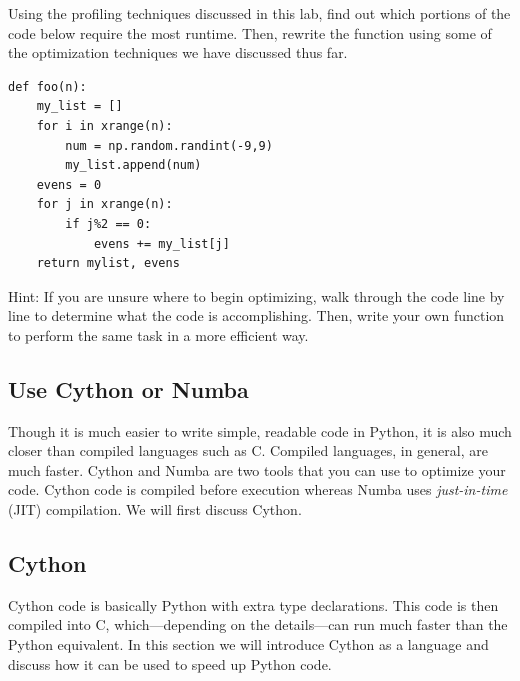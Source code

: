 \begin{problem}
Using the profiling techniques discussed in this lab, find out which portions of the code below require the most runtime. Then, rewrite the function using some of the optimization techniques we have discussed thus far.
\begin{lstlisting}
def foo(n):
    my_list = []
    for i in xrange(n):
        num = np.random.randint(-9,9)
        my_list.append(num)
    evens = 0
    for j in xrange(n):
        if j%2 == 0:
            evens += my_list[j]
    return mylist, evens
\end{lstlisting}

Hint: If you are unsure where to begin optimizing, walk through the code line by line to determine what the code is accomplishing. Then, write your own function to perform the same task in a more efficient way.
\end{problem}


\subsection*{Use Cython or Numba}
Though it is much easier to write simple, readable code in Python, it is also much closer than compiled languages such as C. Compiled languages, in general, are much faster.
Cython and Numba are two tools that you can use to optimize your code. Cython code is compiled before execution whereas Numba uses \emph{just-in-time} (JIT) compilation. We will first discuss Cython.

\subsection*{Cython}
Cython code is basically Python with extra type declarations.
This code is then compiled into C, which---depending on the details---can run much faster than the Python equivalent.
In this section we will introduce Cython as a language and discuss how it can be used to speed up Python code.

